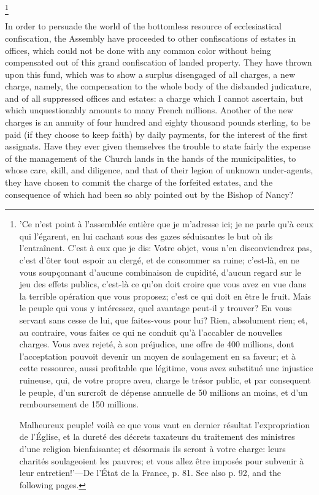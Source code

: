 \footnote{ 'Ce n'est point à l'assemblée entière que je m'adresse ici; je ne parle qu'à ceux qui l'égarent, en lui cachant sous des gazes séduisantes le but où ils l'entraînent. C'est à eux que je dis: Votre objet, vous n'en disconviendrez pas, c'est d'ôter tout espoir au clergé, et de consommer sa ruine; c'est-là, en ne vous soupçonnant d'aucune combinaison de cupidité, d'aucun regard sur le jeu des effets publics, c'est-là ce qu'on doit croire que vous avez en vue dans la terrible opération que vous proposez; c'est ce qui doit en être le fruit. Mais le peuple qui vous y intéressez, quel avantage peut-il y trouver? En vous servant sans cesse de lui, que faites-vous pour lui? Rien, absolument rien; et, au contraire, vous faites ce qui ne conduit qu'à l'accabler de nouvelles charges. Vous avez rejeté, à son préjudice, une offre de 400 millions, dont l'acceptation pouvoit devenir un moyen de soulagement en sa faveur; et à cette ressource, aussi profitable que légitime, vous avez substitué une injustice ruineuse, qui, de votre propre aveu, charge le trésor public, et par consequent le peuple, d'un surcroît de dépense annuelle de 50 millions an moins, et d'un remboursement de 150 millions.

Malheureux peuple! voilà ce que vous vaut en dernier résultat l'expropriation de l'Église, et la dureté des décrets taxateurs du traitement des ministres d'une religion bienfaisante; et désormais ils scront à votre charge: leurs charités soulageoient les pauvres; et vous allez être imposés pour subvenir à leur entretien!'—De l'État de la France, p. 81. See also p. 92, and the following pages.
}


In order to persuade the world of the bottomless resource of ecclesiastical confiscation, the Assembly have proceeded to other confiscations of estates in offices, which could not be done with any common color without being compensated out of this grand confiscation of landed property. They have thrown upon this fund, which was to show a surplus disengaged of all charges, a new charge, namely, the compensation to the whole body of the disbanded judicature, and of all suppressed offices and estates: a charge which I cannot ascertain, but which unquestionably amounts to many French millions. Another of the new charges is an annuity of four hundred and eighty thousand pounds sterling, to be paid (if they choose to keep faith) by daily payments, for the interest of the first assignats. Have they ever given themselves the trouble to state fairly the expense of the management of the Church lands in the hands of the municipalities, to whose care, skill, and diligence, and that of their legion of unknown under-agents, they have chosen to commit the charge of the forfeited estates, and the consequence of which had been so ably pointed out by the Bishop of Nancy?

